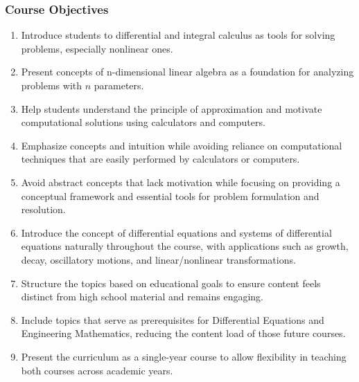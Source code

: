 \documentclass[12pt]{article}
\begin{document}
\subsubsection*{Course Objectives}
\begin{enumerate}
    \item Introduce students to differential and integral calculus as tools for solving problems, especially nonlinear ones.
    \item Present concepts of n-dimensional linear algebra as a foundation for analyzing problems with \( n \) parameters.
    \item Help students understand the principle of approximation and motivate computational solutions using calculators and computers.
    \item Emphasize concepts and intuition while avoiding reliance on computational techniques that are easily performed by calculators or computers.
    \item Avoid abstract concepts that lack motivation while focusing on providing a conceptual framework and essential tools for problem formulation and resolution.
    \item Introduce the concept of differential equations and systems of differential equations naturally throughout the course, with applications such as growth, decay, oscillatory motions, and linear/nonlinear transformations.
    \item Structure the topics based on educational goals to ensure content feels distinct from high school material and remains engaging.
    \item Include topics that serve as prerequisites for Differential Equations and Engineering Mathematics, reducing the content load of those future courses.
    \item Present the curriculum as a single-year course to allow flexibility in teaching both courses across academic years.
\end{enumerate}
\end{document}
